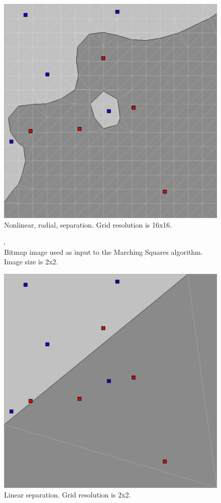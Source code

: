 \documentclass[12pt]{article}
\begin{document}
\begin{figure} 
\centering
  \includegraphics[width = 3 in]{16_res.png}
  \caption{Nonlinear, radial, separation. Grid resolution is 16x16.
}
\end{figure}

\begin{figure} 
\centering
  \includegraphics[width = 3 in]{2_res_image.png}
  \caption{Bitmap image used as input to the Marching Squares algorithm.
Image size is 2x2.
}
\end{figure}


\begin{figure} 
\centering
  \includegraphics[width = 3 in]{2_res.png}
  \caption{Linear separation. Grid resolution is 2x2.
}
\end{figure}
\end{document}
